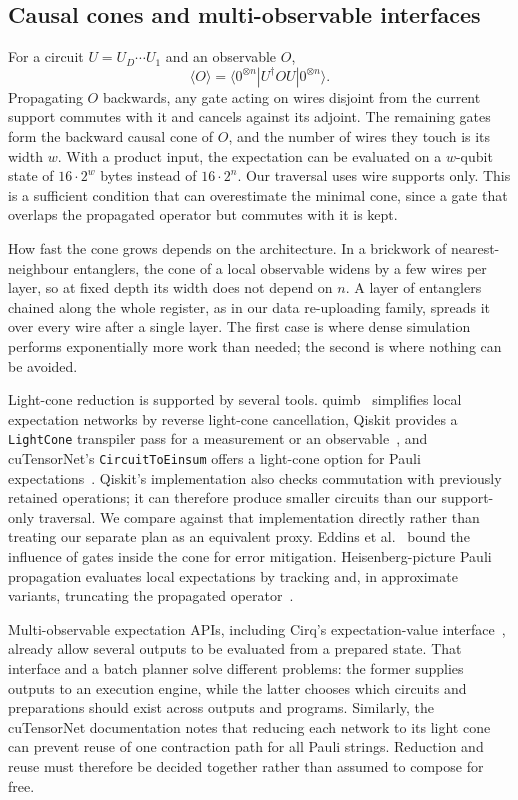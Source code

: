 \subsection{Causal cones and multi-observable interfaces}
For a circuit $U=U_D\cdots U_1$ and an observable $O$,
\begin{equation}
\langle O\rangle=\langle 0^{\otimes n}|U^\dagger O U|0^{\otimes n}\rangle.
\end{equation}
Propagating $O$ backwards, any gate acting on wires disjoint from the current support commutes with it and cancels against its adjoint. The remaining gates form the backward causal cone of $O$, and the number of wires they touch is its width $w$. With a product input, the expectation can be evaluated on a $w$-qubit state of $16\cdot 2^w$ bytes instead of $16\cdot 2^n$. Our traversal uses wire supports only. This is a sufficient condition that can overestimate the minimal cone, since a gate that overlaps the propagated operator but commutes with it is kept.

How fast the cone grows depends on the architecture. In a brickwork of nearest-neighbour entanglers, the cone of a local observable widens by a few wires per layer, so at fixed depth its width does not depend on $n$. A layer of entanglers chained along the whole register, as in our data re-uploading family, spreads it over every wire after a single layer. The first case is where dense simulation performs exponentially more work than needed; the second is where nothing can be avoided.

Light-cone reduction is supported by several tools. quimb~\cite{gray2018quimb} simplifies local expectation networks by reverse light-cone cancellation, Qiskit provides a \texttt{LightCone} transpiler pass for a measurement or an observable~\cite{qiskitlightcone}, and cuTensorNet's \texttt{CircuitToEinsum} offers a light-cone option for Pauli expectations~\cite{cutensornetlightcone}. Qiskit's implementation also checks commutation with previously retained operations; it can therefore produce smaller circuits than our support-only traversal. We compare against that implementation directly rather than treating our separate plan as an equivalent proxy. Eddins et al.~\cite{eddins2024lightcone} bound the influence of gates inside the cone for error mitigation. Heisenberg-picture Pauli propagation evaluates local expectations by tracking and, in approximate variants, truncating the propagated operator~\cite{begusic2023perturbation,lerch2026patches}.

Multi-observable expectation APIs, including Cirq's expectation-value interface~\cite{cirqexpectations}, already allow several outputs to be evaluated from a prepared state. That interface and a batch planner solve different problems: the former supplies outputs to an execution engine, while the latter chooses which circuits and preparations should exist across outputs and programs. Similarly, the cuTensorNet documentation notes that reducing each network to its light cone can prevent reuse of one contraction path for all Pauli strings. Reduction and reuse must therefore be decided together rather than assumed to compose for free.

